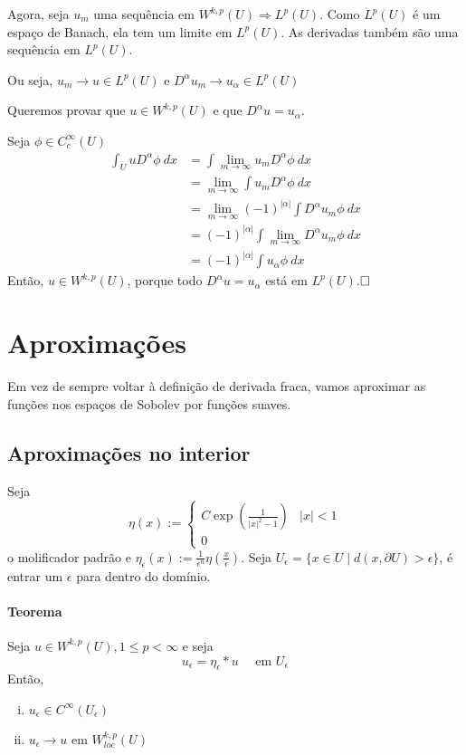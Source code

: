 \documentclass[a4paper, 11pt]{article}
\newcommand{\qed}{$\hfill\square$}
\newcommand{\p}{\partial}
\newcommand{\e}{\epsilon}
\begin{document}
Agora, seja \( u_m \) uma sequência em \( W^{k,p}(U)\Rightarrow L^p(U) \). Como \( L^p(U) \) é um espaço de Banach, ela tem um limite em \( L^p(U) \). As derivadas também são uma sequência em \( L^p(U) \).

Ou seja, \( u_m \rightarrow u \in L^p(U) \) e \( D^\alpha u_m \rightarrow u_{\alpha} \in L^p(U) \)

Queremos provar que \( u \in W^{k,p}(U) \) e que \( D^\alpha u = u_\alpha \).

Seja \( \phi \in C^\infty_c(U) \)
\begin{align*}
	\int_U u D^\alpha \phi\ dx &= \int \lim_{m \rightarrow \infty} u_m D^\alpha \phi \ dx	\\
	&= \lim_{m \rightarrow \infty} \int  u_m D^\alpha \phi \ dx	\\
	&= \lim_{m \rightarrow \infty} (-1)^{|\alpha| }\int D^\alpha  u_m \phi \ dx\\
	&= (-1)^{|\alpha| }\int  \lim_{m \rightarrow \infty} D^\alpha  u_m \phi \ dx		\\
	&= (-1)^{|\alpha| }\int  u_\alpha \phi \ dx
\end{align*}
Então, \( u \in W^{k,p}(U) \), porque todo \( D^\alpha u = u_\alpha \) está em \( L^p(U) \).\qed







\section{Aproximações}

Em vez de sempre voltar à definição de derivada fraca, vamos aproximar as funções nos espaços de Sobolev por funções suaves.

\subsection{Aproximações no interior}

Seja \[ \eta(x):= \begin{cases}
	C \exp\left(\frac{1}{|x|^2-1}\right) & |x|<1\\
	0
\end{cases} \] o molificador padrão e \( \eta_\e(x):= \frac{1}{\e^n}\eta\left(\frac{x}{\e}\right) \). Seja \( U_\e = \{x \in U \mid d(x, \p U) > \e\} \), é entrar um \( \e \) para dentro do domínio.

\paragraph{Teorema} Seja \( u \in W^{k,p}(U), 1 \leq p < \infty \) e seja \[ u_\e = \eta_\e * u\quad  \text{ em } U_\e\] Então, \begin{enumerate}[(i)]
	\item \( u_\e \in C^\infty(U_\e) \)
	\item \( u_\e \rightarrow u \) em \( W^{k,p}_{loc}(U) \)
\end{enumerate}
\end{document}
